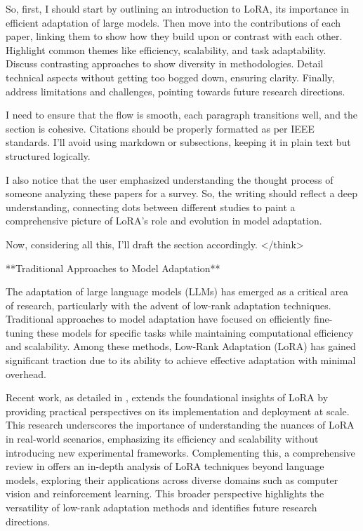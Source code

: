 \documentclass[conference]{IEEEtran}
\begin{document}
So, first, I should start by outlining an introduction to LoRA, its importance in efficient adaptation of large models. Then move into the contributions of each paper, linking them to show how they build upon or contrast with each other. Highlight common themes like efficiency, scalability, and task adaptability. Discuss contrasting approaches to show diversity in methodologies. Detail technical aspects without getting too bogged down, ensuring clarity. Finally, address limitations and challenges, pointing towards future research directions.

I need to ensure that the flow is smooth, each paragraph transitions well, and the section is cohesive. Citations should be properly formatted as per IEEE standards. I'll avoid using markdown or subsections, keeping it in plain text but structured logically.

I also notice that the user emphasized understanding the thought process of someone analyzing these papers for a survey. So, the writing should reflect a deep understanding, connecting dots between different studies to paint a comprehensive picture of LoRA's role and evolution in model adaptation.

Now, considering all this, I'll draft the section accordingly.
</think>

**Traditional Approaches to Model Adaptation**

The adaptation of large language models (LLMs) has emerged as a critical area of research, particularly with the advent of low-rank adaptation techniques. Traditional approaches to model adaptation have focused on efficiently fine-tuning these models for specific tasks while maintaining computational efficiency and scalability. Among these methods, Low-Rank Adaptation (LoRA) has gained significant traction due to its ability to achieve effective adaptation with minimal overhead.

Recent work, as detailed in \cite{b1}, extends the foundational insights of LoRA by providing practical perspectives on its implementation and deployment at scale. This research underscores the importance of understanding the nuances of LoRA in real-world scenarios, emphasizing its efficiency and scalability without introducing new experimental frameworks. Complementing this, a comprehensive review in \cite{b2} offers an in-depth analysis of LoRA techniques beyond language models, exploring their applications across diverse domains such as computer vision and reinforcement learning. This broader perspective highlights the versatility of low-rank adaptation methods and identifies future research directions.
\end{document}
